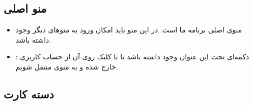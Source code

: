 \documentclass[]{article}
\begin{document}
\subsection*{{\titr منو اصلی}}

\begin{itemize}
    \item
     منوی اصلی برنامه ما است. در این منو باید امکان ورود به منو‌های دیگر وجود داشته باشد.
    \item
     : دکمه‌ای تحت این عنوان وجود داشته باشد تا با کلیک روی آن از حساب کاربری خارج شده و به منوی  منتقل شویم.
\end{itemize}

\subsection*{{\titr دسته کارت}}
\end{document}
